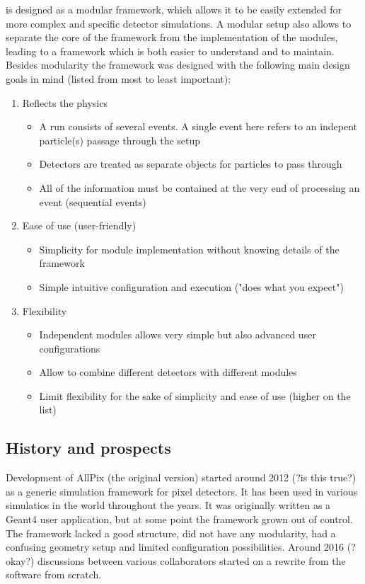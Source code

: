 \apsq is designed as a modular framework, which allows it to be easily extended for more complex and specific detector simulations. A modular setup also allows to separate the core of the framework from the implementation of the modules, leading to a framework which is both easier to understand and to maintain. Besides modularity the \apsq framework was designed with the following main design goals in mind (listed from most to least important):
\begin{enumerate}
    \item Reflects the physics
    \begin{itemize}
        \item A run consists of several events. A single event here refers to an indepent particle(s) passage through the setup
        \item Detectors are treated as separate objects for particles to pass through
        \item All of the information must be contained at the very end of processing an event (sequential events)
    \end{itemize}
    \item Ease of use (user-friendly)
    \begin{itemize}
        \item Simplicity for module implementation without knowing details of the framework
        \item Simple intuitive configuration and execution ("does what you expect")
    \end{itemize}
    \item Flexibility
    \begin{itemize}
        \item Independent modules allows very simple but also advanced user configurations
        \item Allow to combine different detectors with different modules
        \item Limit flexibility for the sake of simplicity and ease of use (higher on the list)
    \end{itemize}
\end{enumerate}

\subsection{History and prospects}
Development of AllPix (the original version) started around 2012 (?is this true?) as a generic simulation framework for pixel detectors. It has been used in various simulatios in the world throughout the years. It was originally written as a Geant4 user application, but at some point the framework grown out of control. The framework lacked a good structure, did not have any modularity, had a confusing geometry setup and limited configuration possibilities. Around 2016 (?okay?) discussions between various collaborators started on a rewrite from the software from scratch. 

